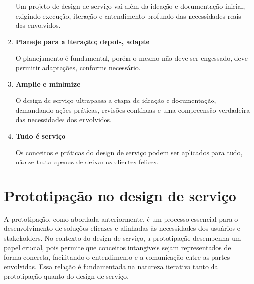 \begin{enumerate}
	Um projeto de design de serviço vai além da ideação e documentação inicial, exigindo execução, iteração e entendimento profundo das necessidades reais dos envolvidos.
	
	\item \textbf{Planeje para a iteração; depois, adapte}
	
	O planejamento é fundamental, porém o mesmo não deve ser engessado, deve permitir adaptações, conforme necessário.
	
	\item \textbf{Amplie e minimize}
	
	O design de serviço ultrapassa a etapa de ideação e documentação, demandando ações práticas, revisões contínuas e uma compreensão verdadeira das necessidades dos envolvidos.
	
	\item \textbf{Tudo é serviço}
	
	Os conceitos e práticas do design de serviço podem ser aplicados para tudo, não se trata apenas de deixar os clientes felizes.
	
\end{enumerate}

\section{Prototipação no design de serviço}

A prototipação, como abordada anteriormente, é um processo essencial para o desenvolvimento de soluções eficazes e alinhadas às necessidades dos usuários e stakeholders. No contexto do design de serviço, a prototipação desempenha um papel crucial, pois permite que conceitos intangíveis sejam representados de forma concreta, facilitando o entendimento e a comunicação entre as partes envolvidas. Essa relação é fundamentada na natureza iterativa tanto da prototipação quanto do design de serviço.


